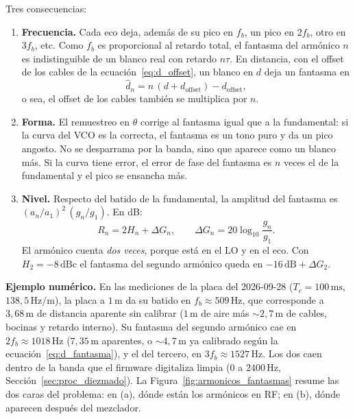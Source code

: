 \documentclass[12pt, a4paper, twoside]{report}
\begin{document}
Tres consecuencias:

\begin{enumerate}
  \item \textbf{Frecuencia.} Cada eco deja, además de su pico en $f_b$, un
    pico en $2f_b$, otro en $3f_b$, etc. Como $f_b$ es proporcional al
    retardo total, el fantasma del armónico $n$ es indistinguible de un
    blanco real con retardo $n\tau$. En distancia, con el offset de los
    cables de la ecuación~\eqref{eq:d_offset}, un blanco en $d$ deja un
    fantasma en
    \begin{equation}
      \hat d_n = n\,(d + d_\text{offset}) - d_\text{offset},
      \label{eq:d_fantasma}
    \end{equation}
    o sea, el offset de los cables también se multiplica por $n$.
  \item \textbf{Forma.} El remuestreo en $\theta$ corrige al fantasma igual
    que a la fundamental: si la curva del VCO es la correcta, el fantasma es
    un tono puro y da un pico angosto. No se desparrama por la banda, sino que
    aparece como un blanco más. Si la curva tiene error, el error de fase del
    fantasma es $n$ veces el de la fundamental y el pico se ensancha más.
  \item \textbf{Nivel.} Respecto del batido de la fundamental, la amplitud
    del fantasma es $(a_n/a_1)^2\,(g_n/g_1)$. En dB:
    \begin{equation}
      R_n = 2H_n + \Delta G_n,
      \qquad \Delta G_n = 20\log_{10}\frac{g_n}{g_1}.
      \label{eq:nivel_fantasma}
    \end{equation}
    El armónico cuenta \emph{dos veces}, porque está en el LO y en el eco.
    Con $H_2 = -8\,\text{dBc}$ el fantasma del segundo armónico queda en
    $-16\,\text{dB} + \Delta G_2$.
\end{enumerate}

\textbf{Ejemplo numérico.} En las mediciones de la placa del 2026-09-28
($T_c = 100\,\text{ms}$, $138{,}5\,\text{Hz/m}$), la placa a $1\,\text{m}$
da su batido en $f_b \approx 509\,\text{Hz}$, que corresponde a
$3{,}68\,\text{m}$ de distancia aparente sin calibrar ($1\,\text{m}$ de aire
más $\sim\!2{,}7\,\text{m}$ de cables, bocinas y retardo interno). Su
fantasma del segundo armónico cae en $2f_b \approx 1018\,\text{Hz}$
($7{,}35\,\text{m}$ aparentes, o $\sim\!4{,}7\,\text{m}$ ya calibrado según
la ecuación~\eqref{eq:d_fantasma}), y el del tercero, en
$3f_b \approx 1527\,\text{Hz}$. Los dos caen dentro de la banda que
el firmware digitaliza limpia ($0$ a $2400\,\text{Hz}$,
Sección~\ref{sec:proc_diezmado}). La Figura~\ref{fig:armonicos_fantasmas}
resume las dos caras del problema: en (a), dónde están los armónicos en RF;
en (b), dónde aparecen después del mezclador.
\end{document}
